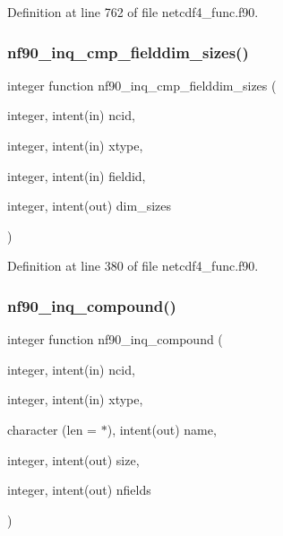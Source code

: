 Definition at line 762 of file netcdf4\+\_\+func.\+f90.

\mbox{\label{netcdf4__func_8f90_aaa372f47755cb3b33f44b42b1e8ab2bd}} 
\subsubsection{\texorpdfstring{nf90\+\_\+inq\+\_\+cmp\+\_\+fielddim\+\_\+sizes()}{nf90\_inq\_cmp\_fielddim\_sizes()}}
{\footnotesize\ttfamily integer function nf90\+\_\+inq\+\_\+cmp\+\_\+fielddim\+\_\+sizes (\begin{DoxyParamCaption}\item[{integer, intent(in)}]{ncid,  }\item[{integer, intent(in)}]{xtype,  }\item[{integer, intent(in)}]{fieldid,  }\item[{integer, intent(out)}]{dim\+\_\+sizes }\end{DoxyParamCaption})}



Definition at line 380 of file netcdf4\+\_\+func.\+f90.

\mbox{\label{netcdf4__func_8f90_ad9d17092e17308011195527cf58dc8a0}} 
\subsubsection{\texorpdfstring{nf90\+\_\+inq\+\_\+compound()}{nf90\_inq\_compound()}}
{\footnotesize\ttfamily integer function nf90\+\_\+inq\+\_\+compound (\begin{DoxyParamCaption}\item[{integer, intent(in)}]{ncid,  }\item[{integer, intent(in)}]{xtype,  }\item[{character (len = $\ast$), intent(out)}]{name,  }\item[{integer, intent(out)}]{size,  }\item[{integer, intent(out)}]{nfields }\end{DoxyParamCaption})}



